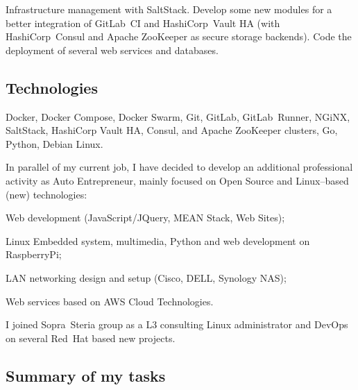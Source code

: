 \vskip 0pt\noindent
Infrastructure management with SaltStack.
Develop some new modules for a better integration of GitLab~CI and
HashiCorp~Vault HA (with HashiCorp~Consul and Apache ZooKeeper as secure storage
backends).
Code the deployment of several web services and databases.

\subsection{Technologies}

\vskip 0pt\noindent
Docker, Docker Compose, Docker Swarm, Git, GitLab, GitLab~Runner, NGiNX, SaltStack,
HashiCorp Vault HA, Consul, and Apache ZooKeeper clusters, Go, Python, Debian Linux.



In parallel of my current job, I have decided to develop an additional professional
activity as Auto Entrepreneur, mainly focused on Open Source and Linux--based (new) technologies:

\item{\bdot} Web development (JavaScript/JQuery, MEAN Stack, Web Sites);
\item{\bdot} Linux Embedded system, multimedia, Python and web development on RaspberryPi;
\item{\bdot} LAN networking design and setup (Cisco, DELL, Synology NAS);
\item{\bdot} Web services based on AWS Cloud Technologies.



I joined Sopra~Steria group as a L3 consulting Linux administrator and DevOps on
several Red~Hat based new projects.

\subsection{Summary of my tasks}

